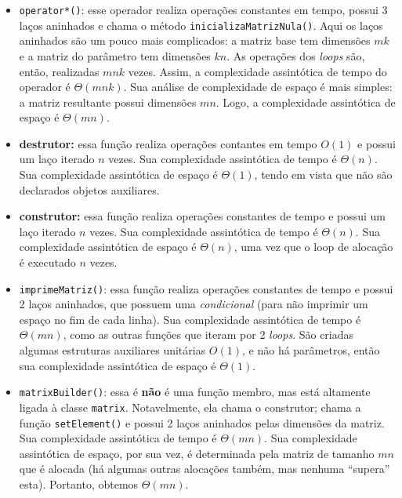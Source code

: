 \documentclass{article}
\def\code#1{\texttt{#1}}
\begin{document}
\begin{itemize}
    \item \code{operator*()}: esse operador realiza operações constantes em tempo, possui 3 laços aninhados e chama o método \code{inicializaMatrizNula()}. Aqui os laços aninhados são um pouco mais complicados: a matriz base tem dimensões \( mk \) e a matriz do parâmetro tem dimensões \( kn \). As operações dos \textit{loops} são, então, realizadas \( mnk \) vezes. Assim, a complexidade assintótica de tempo do operador é \( \Theta(mnk) \). Sua análise de complexidade de espaço é mais simples: a matriz resultante possui dimensões \( mn \). Logo, a complexidade assintótica de espaço é \( \Theta(mn) \).

    \item \textbf{destrutor:} essa função realiza operações contantes em tempo \( O(1) \) e possui um laço iterado \( n \) vezes. Sua complexidade assintótica de tempo é \( \Theta(n) \).  Sua complexidade assintótica de espaço é \( \Theta(1) \), tendo em vista que não são declarados objetos auxiliares.

    \item \textbf{construtor:} essa função realiza operações constantes de tempo e possui um laço iterado \( n \) vezes. Sua complexidade assintótica de tempo é \( \Theta(n) \). Sua complexidade assintótica de espaço é \( \Theta(n) \), uma vez que o loop de alocação é executado \( n \) vezes.

    \item \code{imprimeMatriz()}: essa função realiza operações constantes de tempo e possui 2 laços aninhados, que possuem uma \textit{condicional} (para não imprimir um espaço no fim de cada linha). Sua complexidade assintótica de tempo é \( \Theta(mn) \), como as outras funções que iteram por 2 \textit{loops}. São criadas algumas estruturas auxiliares unitárias \( O(1) \), e não há parâmetros, então sua complexidade assintótica de espaço é \( \Theta(1) \).

    \item \code{matrixBuilder()}: essa é \textbf{não} é uma função membro, mas está altamente ligada à classe \code{matrix}. Notavelmente, ela chama o construtor; chama a função \code{setElement()} e possui 2 laços aninhados pelas dimensões da matriz. Sua complexidade assintótica de tempo é \( \Theta(mn) \). Sua complexidade assintótica de espaço, por sua vez, é determinada pela matriz de tamanho \( mn \) que é alocada (há algumas outras alocações também, mas nenhuma ``supera'' esta). Portanto, obtemos \( \Theta(mn) \).

\end{itemize}
\end{document}

